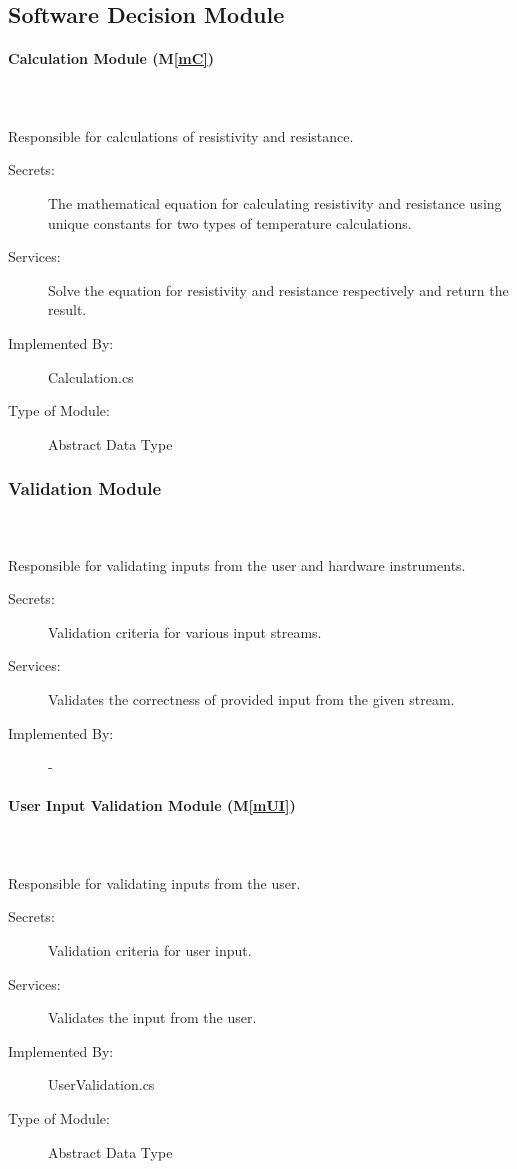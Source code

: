 \documentclass[12pt, titlepage]{article}
\newcommand{\mref}[1]{M\ref{#1}}
\begin{document}
\subsection{Software Decision Module}

\paragraph{Calculation Module (\mref{mC})}
\\~\\
Responsible for calculations of resistivity and resistance.
\begin{description}
  \item[Secrets:] The mathematical equation for calculating resistivity and resistance using unique constants for two types of temperature calculations.
  \item[Services:]Solve the equation for resistivity and resistance respectively and return the result.
  \item[Implemented By:] Calculation.cs 
  \item[Type of Module:] Abstract Data Type
\end{description}

\subsubsection{Validation Module}
\\~\\
Responsible for validating inputs from the user and hardware instruments.
\begin{description}
  \item[Secrets:] Validation criteria for various input streams.
  \item[Services:]Validates the correctness of provided input from the given stream.
  \item[Implemented By:] -
\end{description}

\paragraph{User Input Validation Module (\mref{mUI})}
\\~\\
Responsible for validating inputs from the user.
\begin{description}
  \item[Secrets:] Validation criteria for user input.
  \item[Services:] Validates the input from the user.
  \item[Implemented By:] UserValidation.cs 
  \item[Type of Module:] Abstract Data Type
\end{description}
\end{document}

